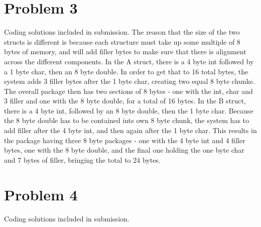 \documentclass[11pt, oneside]{article}   	%
\begin{document}
\section*{Problem 3}
Coding solutions included in submission.
\newline
\newline
The reason that the size of the two structs is different is because each structure must take up some multiple of 8 bytes of memory, and will add filler bytes to make sure that there is alignment across the different components. 
\newline
\newline
In the A struct, there is a 4 byte int followed by a 1 byte char, then an 8 byte double.  In order to get that to 16 total bytes, the system adds 3 filler bytes after the 1 byte char, creating two equal 8 byte chunks.  The overall package then has two sections of 8 bytes - one with the int, char and 3 filler and one with the 8 byte double, for a total of 16 bytes.
\newline
\newline
In the B struct, there is a 4 byte int, followed by an 8 byte double, then the 1 byte char.  Because the 8 byte double has to be contained ints own 8 byte chunk, the system has to add filler after the 4 byte int, and then again after the 1 byte char.  This results in the package having three 8 byte packages - one with the 4 byte int and 4 filler bytes, one with the 8 byte double, and the final one holding the one byte char and 7 bytes of filler, bringing the total to 24 bytes.


\section*{Problem 4}
Coding solutions included in submission.
\end{document}
